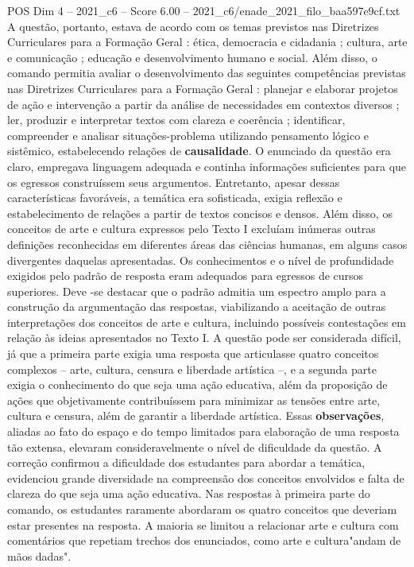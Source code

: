 \begin{textsample}{POS Dim 4 – 2021\_c6 – Score 6.00 – 2021\_c6/enade\_2021\_filo\_baa597e9cf.txt}
A questão, portanto, estava de acordo com os temas previstos nas Diretrizes Curriculares para a Formação Geral : ética, democracia e cidadania ; cultura, arte e comunicação ; educação e desenvolvimento humano e social.
Além disso, o comando permitia avaliar o desenvolvimento das seguintes competências previstas nas Diretrizes Curriculares para a Formação Geral : planejar e elaborar projetos de ação e intervenção a partir da análise de necessidades em contextos diversos ; ler, produzir e interpretar textos com clareza e coerência ; identificar, compreender e analisar situações-problema utilizando pensamento lógico e sistêmico, estabelecendo relações de \textbf{causalidade}.
O enunciado da questão era claro, empregava linguagem adequada e continha informações suficientes para que os egressos construíssem seus argumentos.
Entretanto, apesar dessas características favoráveis, a temática era sofisticada, exigia reflexão e estabelecimento de relações a partir de textos concisos e densos.
Além disso, os conceitos de arte e cultura expressos pelo Texto I excluíam inúmeras outras definições reconhecidas em diferentes áreas das ciências humanas, em alguns casos divergentes daquelas apresentadas.
Os conhecimentos e o nível de profundidade exigidos pelo padrão de resposta eram adequados para egressos de cursos superiores.
Deve -se destacar que o padrão admitia um espectro amplo para a construção da argumentação das respostas, viabilizando a aceitação de outras interpretações dos conceitos de arte e cultura, incluindo possíveis contestações em relação às ideias apresentados no Texto I.
A questão pode ser considerada difícil, já que a primeira parte exigia uma resposta que articulasse quatro conceitos complexos – arte, cultura, censura e liberdade artística –, e a segunda parte exigia o conhecimento do que seja uma ação educativa, além da proposição de ações que objetivamente contribuíssem para minimizar as tensões entre arte, cultura e censura, além de garantir a liberdade artística.
Essas \textbf{observações}, aliadas ao fato do espaço e do tempo limitados para elaboração de uma resposta tão extensa, elevaram consideravelmente o nível de dificuldade da questão.
A correção confirmou a dificuldade dos estudantes para abordar a temática, evidenciou grande diversidade na compreensão dos conceitos envolvidos e falta de clareza do que seja uma ação educativa.
Nas respostas à primeira parte do comando, os estudantes raramente abordaram os quatro conceitos que deveriam estar presentes na resposta.
A maioria se limitou a relacionar arte e cultura com comentários que repetiam trechos dos enunciados, como arte e cultura"andam de mãos dadas".

\end{textsample}

